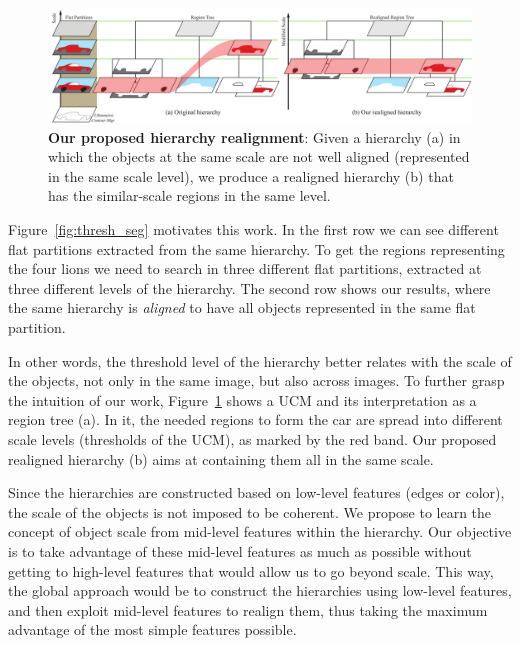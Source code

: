\begin{figure}
\begin{center}
\includegraphics[width=\textwidth]{fig/hierarchy.pdf}
\end{center}
\vspace{-2mm}
\caption{\textbf{Our proposed hierarchy realignment}: Given a hierarchy (a) in which the objects at the same scale are not well aligned (represented in the same scale level), we produce a realigned hierarchy (b) that
has the similar-scale regions in the same level.}
\label{fig:hier_align}
\end{figure}

Figure~\ref{fig:thresh_seg} motivates this work.
In the first row we can see different flat partitions extracted from the same hierarchy.
To get the regions representing the four lions we need to search in three different flat partitions, 
extracted at three different levels of the hierarchy.
The second row shows our results, where the same hierarchy is \textit{aligned} to have all objects represented in the same flat partition.

In other words, the threshold level of the hierarchy better relates with the scale of the objects, not only
in the same image, but also across images.
To further grasp the intuition of our work, Figure~\ref{fig:hier_align} shows a UCM and its interpretation as
a region tree (a).
In it, the needed regions to form the car are spread into different scale levels (thresholds of the UCM), as
marked by the red band.
Our proposed realigned hierarchy (b) aims at containing them all in the same scale.

Since the hierarchies are constructed based on low-level features (edges or color), the scale of the objects
is not imposed to be coherent.
We propose to learn the concept of object scale from mid-level features within the hierarchy.
Our objective is to take advantage of these mid-level features as much as possible without getting to
high-level features that would allow us to go beyond scale.
This way, the global approach would be to construct the hierarchies using low-level features,
and then exploit mid-level features to realign them, thus taking the maximum advantage of the most simple 
features possible.

